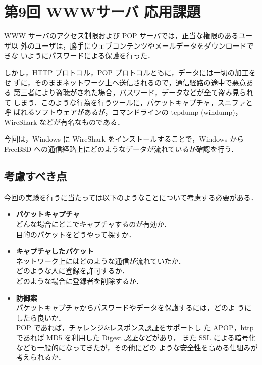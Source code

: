 \section{第9回 WWWサーバ 応用課題}

WWW サーバのアクセス制限および POP サーバでは，正当な権限のあるユーザ以
外のユーザは，勝手にウェブコンテンツやメールデータをダウンロードできな
いようにパスワードによる保護を行った．

しかし，HTTP プロトコル，POP プロトコルともに，データには一切の加工をせ
ずに，そのままネットワーク上へ送信されるので，通信経路の途中で悪意ある
第三者により盗聴がされた場合，パスワード，データなどが全て盗み見られて
しまう．このような行為を行うツールに，パケットキャプチャ，スニファと呼
ばれるソフトウェアがあるが，コマンドラインの tcpdump
(windump)，WireShark などが有名なものである．

今回は，Windows に WireShark をインストールすることで，Windows から
FreeBSD への通信経路上にどのようなデータが流れているか確認を行う．

\subsection*{考慮すべき点}
今回の実験を行うに当たっては以下のようなことについて考慮する必要がある．
\begin{itemize}
  \item \textbf{パケットキャプチャ}\\
         どんな場合にどこでキャプチャするのが有効か．\\
         目的のパケットをどうやって探すか．
  \item \textbf{キャプチャしたパケット}\\
         ネットワーク上にはどのような通信が流れていたか．\\
         どのような人に登録を許可するか．\\
         どのような場合に登録者を削除するか．\\
       \item \textbf{防御案}\\
         パケットキャプチャからパスワードやデータを保護するには，どのよ
         うにしたら良いか．\\
         POP であれば，チャレンジ\&レスポンス認証をサポートし
         た APOP，http であれば MD5 を利用した Digest 認証などがあり，
         また SSL による暗号化なども一般的になってきたが，その他にどの
         ような安全性を高める仕組みが考えられるか．
\end{itemize}

